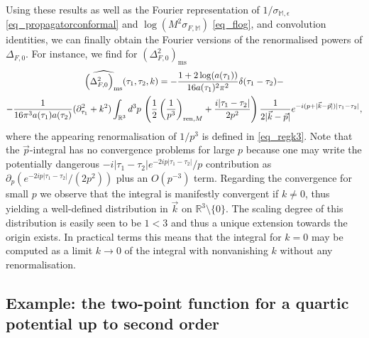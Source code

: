 \documentclass[a4paper,10pt,twoside]{article}
\numberwithin{equation}{section}
\newcounter{and}
\def\bbR{\mathbb{R}}
\def\bbM{\mathbb{M}}
\def\ms{\mathrm{ms}}
\theoremstyle{plain}
\theoremstyle{definition}
\begin{document}
Using these results as well as the Fourier representation of $1/\sigma_{\bbM,\epsilon}$ \eqref{eq_propagatorconformal} and $\log \left(M^2\sigma_{F,\bbM}\right)$
\eqref{eq_flog}, and convolution identities, we can finally obtain the Fourier versions of the renormalised powers of $\Delta_{F,0}$. For instance, we find for $\left(\Delta^2_{F,0}\right)_\ms$
%
\begin{gather}\label{eq_fouriersquare}
\widehat{\left(\Delta^2_{F,0}\right)_\text{ms}}(\tau_1,\tau_2,k)=-\frac{1+2\log (a(\tau_1))}{16a(\tau_1)^2\pi^2}\delta(\tau_1-\tau_2)-\\
-\frac{1}{16\pi^3 a(\tau_1)a(\tau_2)}(\partial^2_{\tau_1}+k^2)\int_{\bbR^3}d^3p\,\left(\frac12\left(\frac{1}{p^3}\right)_{\text{ren},M}+\frac{i|\tau_1-\tau_2|}{2p^2}\right)\frac{1}{2|\vec{k}-\vec{p}|}e^{-i(p+|\vec{k}-\vec{p}|)|\tau_1-\tau_2|},\notag
\end{gather}
%
where the appearing renormalisation of $1/p^3$ is defined in \eqref{eq_regk3}. Note that the $\vec{p}$-integral has no convergence problems for large $p$ because one may write the potentially dangerous $-i|\tau_1-\tau_2|e^{-2ip|\tau_1-\tau_2|}/p$ contribution as $\partial_p( e^{-2ip|\tau_1-\tau_2|}/(2p^2))$ plus an $O(p^{-3})$ term. Regarding the convergence for small $p$ we observe that the integral is manifestly convergent if $k\neq0$, thus yielding a well-defined distribution in $\vec{k}$ on $\bbR^3\setminus\{0\}$. The scaling degree of this distribution is easily seen to be $1<3$ and thus a unique extension towards the origin exists. In practical terms this means that the integral for $k=0$ may be computed as a limit $k\to0$ of the integral with nonvanishing $k$ without any renormalisation. 


\subsection{Example: the two-point function for a quartic potential up to second order}
\end{document}
